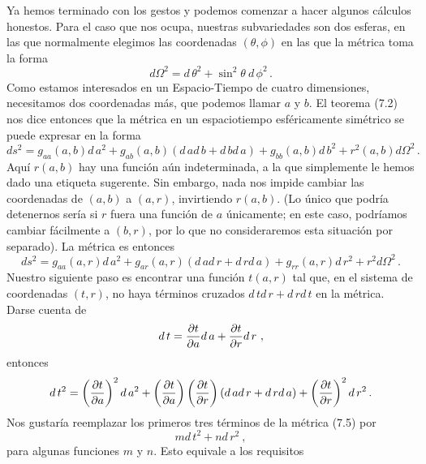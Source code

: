 \documentclass[11pt,b5paper,openany,twoside]{book}
\begin{document}
Ya hemos terminado con los gestos y podemos comenzar a hacer algunos cálculos honestos.
Para el caso que nos ocupa, nuestras subvariedades son dos esferas, en las que normalmente elegimos las coordenadas $(\theta,\phi)$ en las que la métrica toma la forma
\begin{equation}
d\Omega^2 =  d\,\theta^2 + \sin^2\theta\  d\,\phi^2\,.\label{7.3}
\end{equation}
Como estamos interesados en un Espacio-Tiempo de cuatro dimensiones, necesitamos dos coordenadas más, que podemos llamar $a$ y $b$.
El teorema (7.2) nos dice entonces que la métrica en un espaciotiempo esféricamente simétrico se puede expresar en la forma
\begin{equation}
ds^2 = g_{aa}(a,b) d\,a^2 + g_{ab}(a,b)( d\,a d\,b+ d\,b d\,a)
+g_{bb}(a,b) d\,b^2 + r^2(a,b)d\Omega^2\,.\label{7.4}
\end{equation}
Aquí $r(a,b)$ hay una función aún indeterminada, a la que simplemente le hemos dado una etiqueta sugerente.
Sin embargo, nada nos impide cambiar las coordenadas de $(a,b)$ a $(a,r)$, invirtiendo $r(a,b)$.
(Lo único que podría detenernos sería si $r$ fuera una función de $a$ únicamente; en este caso, podríamos cambiar fácilmente a $(b,r)$, por lo que no consideraremos esta situación por separado).
La métrica es entonces
\begin{equation}
ds^2 = g_{aa}(a,r) d\,a^2 + g_{ar}(a,r)( d\,a d\,r+ d\,r d\,a)
+g_{rr}(a,r) d\,r^2 + r^2 d\Omega^2\,.\label{7.5}
\end{equation}
Nuestro siguiente paso es encontrar una función $t(a,r)$ tal que, en el sistema de coordenadas $(t,r)$, no haya términos cruzados $ d\,t d\,r+ d\,r d\,t$ en la métrica.
Darse cuenta de
\begin{equation}
 d\,t = {{\partial t}\over{\partial a}} d\,a + {{\partial t}\over
{\partial r}} d\,r \ ,\label{7.6}
\end{equation}
entonces
\begin{equation}
 d\,t^2 = \left({{\partial t}\over{\partial a}}\right)^2 d\,a^2
+ \left({{\partial t}\over{\partial a}}\right)\left({{\partial t}
\over{\partial r}}\right)
( d\,a d\,r+ d\,r d\,a) + \left({{\partial t}\over{\partial r}}\right)^2
 d\,r^2\,.\label{7.7}
\end{equation}
Nos gustaría reemplazar los primeros tres términos de la métrica (7.5) por
\begin{equation}
m d\,t^2 + n d\,r^2\ ,\label{7.8}
\end{equation}
para algunas funciones $m$ y $n$.
Esto equivale a los requisitos
\end{document}
